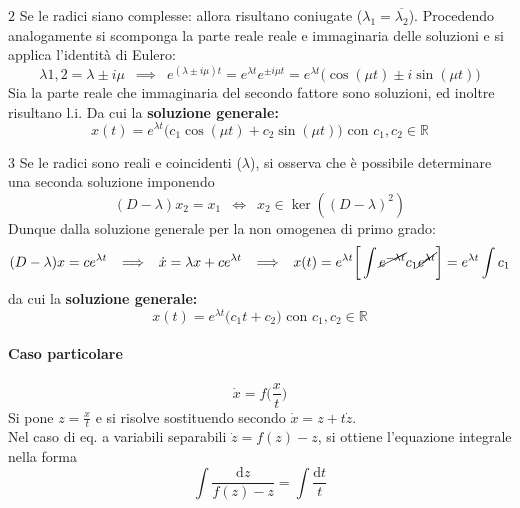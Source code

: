 \documentclass[10pt]{article}
\theoremstyle{plain}
\begin{document}
$\boxed{2}$ Se le radici siano complesse: allora risultano coniugate ($\lambda_1 = \overline{\lambda_2}$). Procedendo analogamente si scomponga la parte reale reale e immaginaria delle soluzioni e si applica l'identità di Eulero:
\[\lambda{1,2} = \lambda \pm i \mu \enspace \implies \enspace e^{(\lambda \pm i \mu) t} = e^{\lambda t}e^{\pm i\mu t} = e^{\lambda t}\big(\cos(\mu t) \pm i \sin(\mu t)\big)\]
Sia la parte reale che immaginaria del secondo fattore sono soluzioni, ed inoltre risultano l.i. Da cui la \textbf{soluzione generale:}
\[\boxed{x(t) = e^{\lambda t}\big(c_1 \cos(\mu t) + c_2 \sin(\mu t)\big)} \textrm{ con } c_1, c_2 \in \mathbb{R}\]

$\boxed{3}$ Se le radici sono reali e coincidenti ($\lambda$), si osserva che è possibile determinare una seconda soluzione imponendo 
\[(D - \lambda) x_2 = x_1 \enspace \Leftrightarrow \enspace x_2 \in \ker((D - \lambda)^2)\]
Dunque dalla soluzione generale per la non omogenea di primo grado:
\[(D - \lambda) x = c e^{\lambda t} \enspace \implies \enspace \dot x = \lambda x + c e^{\lambda t} \enspace \implies \enspace x(t) = e^{\lambda t}\bigg[\int \cancel{e^{-\lambda t}} c_1 \cancel{e^{\lambda t}}\bigg] = e^{\lambda t} \int c_1\]
da cui la \textbf{soluzione generale:}
\[\boxed{x(t) = e^{\lambda t}\big(c_1 t + c_2\big)} \textrm{ con } c_1, c_2 \in \mathbb{R}\]

\paragraph*{Caso particolare}
\[\dot x = f\big(\frac{x}{t}\big)\]
Si pone $\displaystyle z = \frac{x}{t}$ e si risolve sostituendo secondo $\dot x = z + t \dot z$.
\\Nel caso di eq. a variabili separabili $\dot z = f(z) - z$, si ottiene l'equazione integrale nella forma
\[\int \frac{\textrm{d}z}{f(z) - z} = \int\frac{\textrm{d}t}{t}\]
\end{document}
